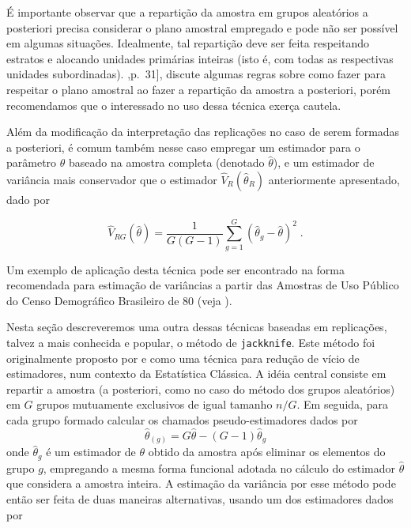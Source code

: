 \documentclass[]{book}
\numberwithin{example}{chapter}
\numberwithin{remark}{chapter}
\numberwithin{definition}{chapter}
\begin{document}
É importante observar que a repartição da amostra em grupos aleatórios a
posteriori precisa considerar o plano amostral empregado e pode não ser
possível em algumas situações. Idealmente, tal repartição deve ser feita
respeitando estratos e alocando unidades primárias inteiras (isto é, com
todas as respectivas unidades subordinadas). \citep{W85},p.~31{]},
discute algumas regras sobre como fazer para respeitar o plano amostral
ao fazer a repartição da amostra a posteriori, porém recomendamos que o
interessado no uso dessa técnica exerça cautela.

Além da modificação da interpretação das replicações no caso de serem
formadas a posteriori, é comum também nesse caso empregar um estimador
para o parâmetro \(\theta\) baseado na amostra completa (denotado
\(\widehat{\theta }\)), e um estimador de variância mais conservador que
o estimador \(\widehat{V}_{R}\left( \widehat{\theta }_{R}\right)\)
anteriormente apresentado, dado por

\begin{equation}
\widehat{V}_{RG}\left( \widehat{\theta }\right) =\frac{1}{G\left( G-1\right) 
}\sum_{g=1}^{G}\left( \widehat{\theta }_{g}-\widehat{\theta }\right) ^{2}\;.
\label{eq:estpa25}
\end{equation}

Um exemplo de aplicação desta técnica pode ser encontrado na forma
recomendada para estimação de variâncias a partir das Amostras de Uso
Público do Censo Demográfico Brasileiro de 80 (veja \citep{IBGE85}).

Nesta seção descreveremos uma outra dessas técnicas baseadas em
replicações, talvez a mais conhecida e popular, o método de
\texttt{jackknife}. Este método foi originalmente proposto por
\citep{Queno49} e \citep{Queno56} como uma técnica para redução de vício
de estimadores, num contexto da Estatística Clássica. A idéia central
consiste em repartir a amostra (a posteriori, como no caso do método dos
grupos aleatórios) em \(G\) grupos mutuamente exclusivos de igual
tamanho \(n/G\). Em seguida, para cada grupo formado calcular os
chamados pseudo-estimadores dados por \[
\widehat{\theta }_{\left( g\right) }=G\widehat{\theta }-\left( G-1\right) 
\widehat{\theta }_{g} 
\] onde \(\widehat{\theta }_{g}\) é um estimador de \(\theta\) obtido da
amostra após eliminar os elementos do grupo \(g\), empregando a mesma
forma funcional adotada no cálculo do estimador \(\widehat{\theta}\) que
considera a amostra inteira. A estimação da variância por esse método
pode então ser feita de duas maneiras alternativas, usando um dos
estimadores dados por
\end{document}
